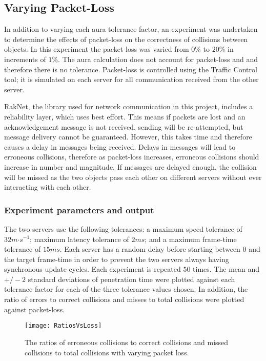 \subsection{Varying Packet-Loss}

In addition to varying each aura tolerance factor, an experiment was undertaken to determine the effects of packet-loss on the correctness of collisions between objects. In this experiment the packet-loss was varied from $0\%$ to $20\%$ in increments of $1\%$. The aura calculation does not account for packet-loss and and therefore there is no tolerance. Packet-loss is controlled using the Traffic Control tool; it is simulated on each server for all communication received from the other server.

RakNet, the library used for network communication in this project, includes a reliability layer, which uses best effort. This means if packets are lost and an acknowledgement message is not received, sending will be re-attempted, but message delivery cannot be guaranteed. However, this takes time and therefore causes a delay in messages being received. Delays in messages will lead to erroneous collisions, therefore as packet-loss increases, erroneous collisions should increase in number and magnitude. If messages are delayed enough, the collision will be missed as the two objects pass each other on different servers without ever interacting with each other. 

\subsubsection{Experiment parameters and output}
The two servers use the following tolerances: a maximum speed tolerance of $32m\mathord{\cdot}s^{-1}$; maximum latency tolerance of $2ms$; and a maximum frame-time tolerance of $15ms$. Each server has a random delay before starting between $0$ and the target frame-time in order to prevent the two servers always having synchronous update cycles. Each experiment is repeated $50$ times. The mean and $+/-2$ standard deviations of penetration time were plotted against each tolerance factor for each of the three tolerance values chosen. In addition, the ratio of errors to correct collisions and misses to total collisions were plotted against packet-loss.

\begin{figure}
	\centering
	\texttt{[image: RatiosVsLoss]}
	\caption{The ratios of erroneous collisions to correct collisions and missed collisions to total collisions with varying packet loss.} %
	\label{fig_RatiosVsLoss}
\end{figure}

